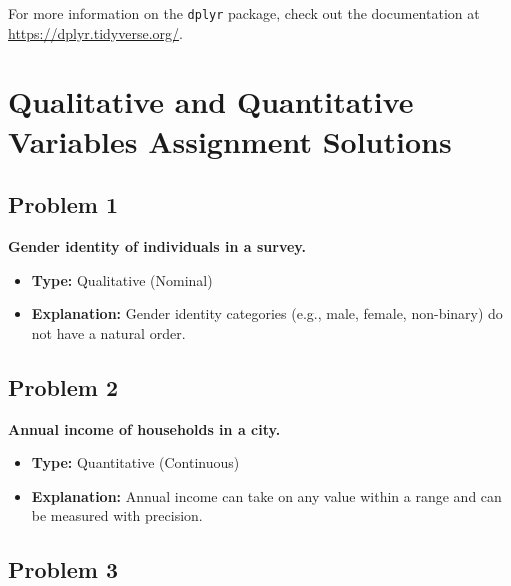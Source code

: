 \documentclass[
  letterpaper,
  DIV=11,
  numbers=noendperiod]{scrreprt}
\begin{document}
For more information on the \texttt{dplyr} package, check out the
documentation at \url{https://dplyr.tidyverse.org/}.

\cleardoublepage
{}
{}
\appendix

\chapter*{Qualitative and Quantitative Variables Assignment
Solutions}\label{qualitative-and-quantitative-variables-assignment-solutions}


\section*{Problem 1}\label{problem-1-2}


\textbf{Gender identity of individuals in a survey.}

\begin{itemize}
\item
  \textbf{Type:} Qualitative (Nominal)
\item
  \textbf{Explanation:} Gender identity categories (e.g., male, female,
  non-binary) do not have a natural order.
\end{itemize}

\section*{Problem 2}\label{problem-2-2}


\textbf{Annual income of households in a city.}

\begin{itemize}
\item
  \textbf{Type:} Quantitative (Continuous)
\item
  \textbf{Explanation:} Annual income can take on any value within a
  range and can be measured with precision.
\end{itemize}

\section*{Problem 3}\label{problem-3-2}
\end{document}

